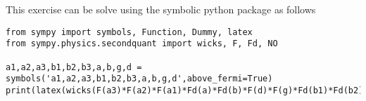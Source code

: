 \documentclass[%
twoside,                 %
final,                   %
10pt]{article}
\begin{document}
This exercise can be solve using the symbolic python package as follows
\begin{verbatim}
from sympy import symbols, Function, Dummy, latex
from sympy.physics.secondquant import wicks, F, Fd, NO

a1,a2,a3,b1,b2,b3,a,b,g,d = symbols('a1,a2,a3,b1,b2,b3,a,b,g,d',above_fermi=True)
print(latex(wicks(F(a3)*F(a2)*F(a1)*Fd(a)*Fd(b)*F(d)*F(g)*Fd(b1)*Fd(b2)*Fd(b3),keep_only_fully_contracted=True)))
\end{verbatim}





















\printindex
\end{document}

